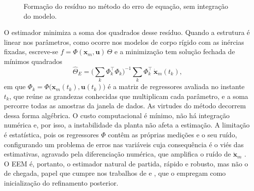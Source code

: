 {\begin{figure}[ht]
  \centering
  \caption{\color{blue}Formação do resíduo no método do erro de equação, sem integração do modelo.}
  \label{fig:residuo-eem}
\end{figure}

O estimador minimiza a soma dos quadrados desse resíduo. Quando a estrutura é linear nos parâmetros, como ocorre nos modelos de corpo rígido com as inércias fixadas, escreve-se $f = \Phi(\mathbf{x}_m,\mathbf{u})\,\Theta$ e a minimização tem solução fechada de mínimos quadrados \cite{Aguirre2015}
\begin{equation}
\hat{\Theta}_{E} = \Big(\textstyle\sum_k \Phi_k^{\top}\Phi_k\Big)^{-1} \textstyle\sum_k \Phi_k^{\top}\,\dot{\mathbf{x}}_{m}(t_k),
\label{eq:eem-ls}
\end{equation}
em que $\Phi_k = \Phi\big(\mathbf{x}_m(t_k),\mathbf{u}(t_k)\big)$ é a matriz de regressores avaliada no instante $t_k$, que reúne as grandezas conhecidas que multiplicam cada parâmetro, e a soma percorre todas as amostras da janela de dados. As virtudes do método decorrem dessa forma algébrica. O custo computacional é mínimo, não há integração numérica e, por isso, a instabilidade da planta não afeta a estimação. A limitação é estatística, pois os regressores $\Phi$ contêm as próprias medições e o seu ruído, configurando um problema de erros nas variáveis cuja consequência é o viés das estimativas, agravado pela diferenciação numérica, que amplifica o ruído de $\dot{\mathbf{x}}_m$ \cite{Jategaonkar2015}. O EEM é, portanto, o estimador natural de partida, rápido e robusto, mas não o de chegada, papel que cumpre nos trabalhos de \textcite{Graesdal2021} e \textcite{Sato2021}, que o empregam como inicialização do refinamento posterior.

}
